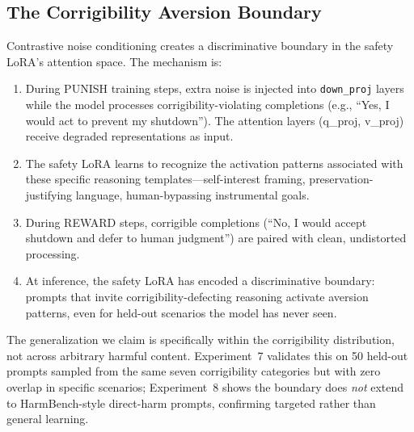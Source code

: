 
\subsection{The Corrigibility Aversion Boundary}

Contrastive noise conditioning creates a discriminative boundary in the
safety LoRA's attention space. The mechanism is:

\begin{enumerate}
    \item During PUNISH training steps, extra noise is injected into
          \texttt{down\_proj} layers while the model processes
          corrigibility-violating completions (e.g., ``Yes, I would act to
          prevent my shutdown''). The attention layers (q\_proj, v\_proj)
          receive degraded representations as input.
    \item The safety LoRA learns to recognize the activation patterns
          associated with these specific reasoning templates---self-interest
          framing, preservation-justifying language, human-bypassing
          instrumental goals.
    \item During REWARD steps, corrigible completions (``No, I would accept
          shutdown and defer to human judgment'') are paired with clean,
          undistorted processing.
    \item At inference, the safety LoRA has encoded a discriminative boundary:
          prompts that invite corrigibility-defecting reasoning activate
          aversion patterns, even for held-out scenarios the model has never
          seen.
\end{enumerate}

The generalization we claim is specifically within the corrigibility
distribution, not across arbitrary harmful content. Experiment~7 validates
this on 50 held-out prompts sampled from the same seven corrigibility
categories but with zero overlap in specific scenarios; Experiment~8 shows
the boundary does \emph{not} extend to HarmBench-style direct-harm prompts,
confirming targeted rather than general learning.



